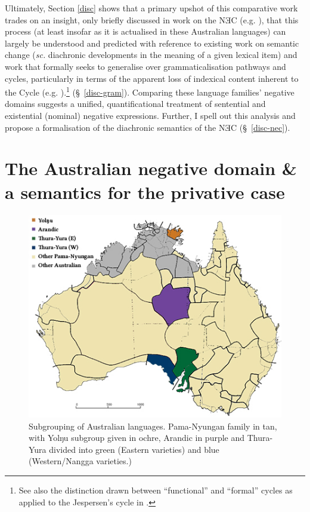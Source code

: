 Ultimately, Section \ref{disc} shows that a primary upshot of this comparative work trades on an insight, only briefly discussed in work on the NƎC (e.g. \citealt[17]{Croft1991}), that this process (at least insofar as it is actualised in these Australian languages) can largely be understood and predicted with reference to existing work on semantic change (\textit{sc.} diachronic developments in the meaning of a given lexical item) and work that formally seeks to generalise over grammaticalisation pathways and cycles, particularly in terms of the apparent loss of indexical content inherent to the Cycle (e.g. \citealt{Deo2015,Deo2015a,Deo2017a}).\footnote{See also the distinction drawn between ``functional'' and ``formal'' cycles as applied to the Jespersen's cycle in \citet{Ahern}.} (\S~\ref{disc-gram}).  Comparing these language families' negative domains suggests a unified, quantificational treatment of sentential and existential (nominal) negative expressions. Further, I spell out this analysis and propose a formalisation of the diachronic semantics of the NƎC (\S~\ref{disc-nec}).

\section{The Australian negative domain \& a semantics for the privative case}\label{typ-sec}
\begin{figure}\centering
	\includegraphics[scale=.7]{YolTYAr-leg.jpg}
	\caption{{\small Subgrouping of Australian languages. Pama-Nyungan family in tan, with Yolŋu subgroup given in ochre, Arandic in purple and Thura-Yura divided into green (Eastern varieties) and blue (Western/Nangga varieties.) }}\label{Map}
\end{figure}


